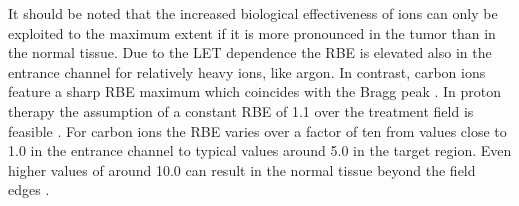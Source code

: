 %
It should be noted that the increased biological effectiveness of ions
can only be exploited to the maximum extent if it is more pronounced
in the tumor than in the normal tissue. Due to the \ac{LET} dependence
the \ac{RBE} is elevated also in the entrance channel for relatively
heavy ions, like argon.  In contrast, carbon ions feature a sharp
\ac{RBE} maximum which coincides with the Bragg peak
\citep{Kraft2000}. In proton therapy the assumption of a constant \ac{RBE}
of 1.1 over the treatment field is feasible \citep{Paganetti2002}. For
carbon ions the \ac{RBE} varies over a factor of ten from values close
to 1.0 in the entrance channel to typical values around 5.0 in the
target region. Even higher values of around 10.0 can result in the normal
tissue beyond the field edges \citep{Kraft2009}. 


